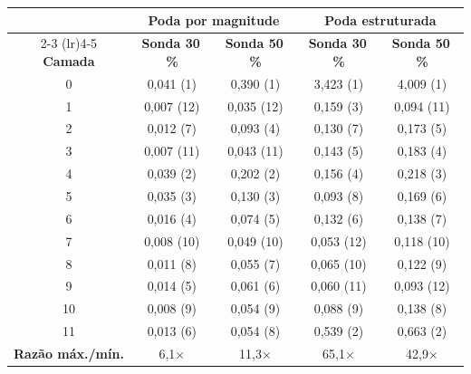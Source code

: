 \begin{tabular}{c cc cc}
\toprule
& \multicolumn{2}{c}{\textbf{Poda por magnitude}} & \multicolumn{2}{c}{\textbf{Poda estruturada}} \\
\cmidrule(lr){2-3} \cmidrule(lr){4-5}
\textbf{Camada} & \textbf{Sonda 30\,\%} & \textbf{Sonda 50\,\%} & \textbf{Sonda 30\,\%} & \textbf{Sonda 50\,\%} \\
\midrule
0 & 0,041 (1) & 0,390 (1) & 3,423 (1) & 4,009 (1) \\
1 & 0,007 (12) & 0,035 (12) & 0,159 (3) & 0,094 (11) \\
2 & 0,012 (7) & 0,093 (4) & 0,130 (7) & 0,173 (5) \\
3 & 0,007 (11) & 0,043 (11) & 0,143 (5) & 0,183 (4) \\
4 & 0,039 (2) & 0,202 (2) & 0,156 (4) & 0,218 (3) \\
5 & 0,035 (3) & 0,130 (3) & 0,093 (8) & 0,169 (6) \\
6 & 0,016 (4) & 0,074 (5) & 0,132 (6) & 0,138 (7) \\
7 & 0,008 (10) & 0,049 (10) & 0,053 (12) & 0,118 (10) \\
8 & 0,011 (8) & 0,055 (7) & 0,065 (10) & 0,122 (9) \\
9 & 0,014 (5) & 0,061 (6) & 0,060 (11) & 0,093 (12) \\
10 & 0,008 (9) & 0,054 (9) & 0,088 (9) & 0,138 (8) \\
11 & 0,013 (6) & 0,054 (8) & 0,539 (2) & 0,663 (2) \\
\midrule
\textbf{Razão máx./mín.} & 6,1$\times$ & 11,3$\times$ & 65,1$\times$ & 42,9$\times$ \\
\bottomrule
\end{tabular}
